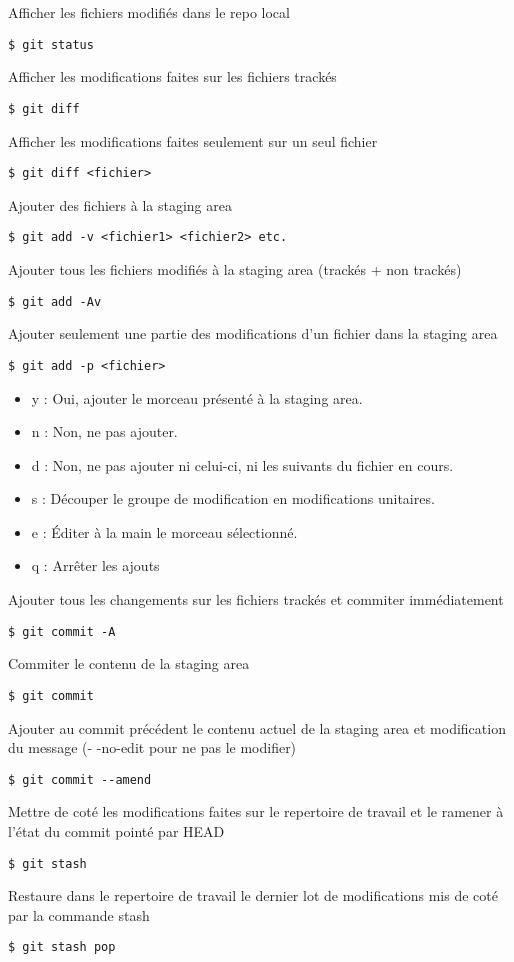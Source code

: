 \documentclass[jou,floatsintext]{apa6}
\begin{document}
Afficher les fichiers modifiés dans le repo local
\begin{lstlisting}
$ git status
\end{lstlisting}
Afficher les modifications faites sur les fichiers trackés
\begin{lstlisting}
$ git diff
\end{lstlisting}
Afficher les modifications faites seulement sur un seul fichier
\begin{lstlisting}
$ git diff <fichier>
\end{lstlisting}
Ajouter des fichiers à la staging area
\begin{lstlisting}
$ git add -v <fichier1> <fichier2> etc.
\end{lstlisting}
Ajouter tous les fichiers modifiés à la staging area (trackés + non trackés)
\begin{lstlisting}
$ git add -Av 
\end{lstlisting}
Ajouter seulement une partie des modifications d'un fichier dans la staging area
\begin{lstlisting}
$ git add -p <fichier>
\end{lstlisting}
\begin{itemize}
	\item y : Oui, ajouter le morceau présenté à la staging area.
	\item n : Non, ne pas ajouter.
	\item d : Non, ne pas ajouter ni celui-ci, ni les suivants du fichier en cours.
	\item s : Découper le groupe de modification en modifications unitaires.
	\item e : Éditer à la main le morceau sélectionné.
	\item q : Arrêter les ajouts
\end{itemize}
Ajouter tous les changements sur les fichiers trackés et commiter immédiatement
\begin{lstlisting}
$ git commit -A
\end{lstlisting}
Commiter le contenu de la staging area
\begin{lstlisting}
$ git commit 
\end{lstlisting}
Ajouter au commit précédent le contenu actuel de la staging area et modification du message (- -no-edit pour ne pas le modifier)
\begin{lstlisting}
$ git commit --amend
\end{lstlisting}
Mettre de coté les modifications faites sur le repertoire de travail et le ramener à l'état du commit pointé par HEAD
\begin{lstlisting}
$ git stash
\end{lstlisting}
Restaure dans le repertoire de travail le dernier lot de modifications mis de coté par la commande stash
\begin{lstlisting}
$ git stash pop
\end{lstlisting} 
\end{document}
